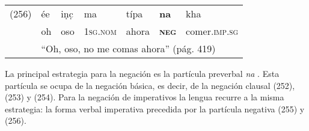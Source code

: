 {%
\begin{tabular}{lllllll}
(256) & ée & iṇc̣ & ma & típa & \textbf{na} & kha \\
& oh & oso & \textsc{1sg.nom} & ahora & \textsc{\textbf{neg}} & comer.\textsc{imp.sg} \\
& \multicolumn{6}{l}{``Oh, oso, no me comas ahora'' (pág. 419)}
\end{tabular} \vspace{0.5cm}

}

La principal estrategia para la negación es la partícula preverbal {\setmainfont{Charis SIL} \textit{na}} \textcolor{MidnightBlue}{\citep{palula}}. Esta partícula se ocupa de la negación básica, es decir, de la negación clausal (252), (253) y (254). Para la negación de imperativos la lengua recurre a la misma estrategia: la forma verbal imperativa precedida por la partícula negativa (255) y (256).